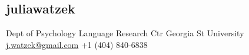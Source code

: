 \documentclass[]{friggeri-cv}
\begin{document}


\begin{aside}
  \section{{\normalfont julia}watzek}
    Dept of Psychology
    Language Research Ctr
    Georgia St University
    ~
    \href{mailto:j.watzek@gmail.com}{j.watzek@gmail.com}
    +1 (404) 840-6838
\end{aside}






\end{document}
